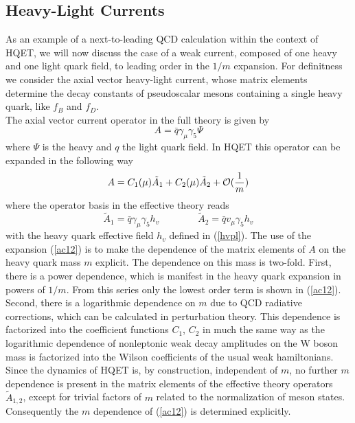 \subsection{Heavy-Light Currents}
\label{sec:HQET:Currents}
As an example of a next-to-leading QCD calculation within the context of
HQET, we will now discuss the case of a weak current, composed of one
heavy and one light quark field, to leading order in the $1/m$ expansion.
For definitness we consider the axial vector heavy-light current, whose
matrix elements determine the decay constants of pseudoscalar mesons
containing a single heavy quark, like $f_B$ and $f_D$.
\\
The axial vector current operator in the full theory is given by
\begin{equation}\label{aqq}
A=\bar q\gamma_\mu\gamma_5 \Psi
\end{equation}
where $\Psi$ is the heavy and $q$ the light quark field. In HQET this operator
can be expanded in the following way
\begin{equation}\label{ac12}
A=C_1(\mu)\tilde A_1+C_2(\mu)\tilde A_2+{\cal O}(\frac{1}{m})
\end{equation}
where the operator basis in the effective theory reads
\begin{equation}\label{at12}
\tilde A_1=\bar q\gamma_\mu\gamma_5 h_v \qquad\qquad
\tilde A_2=\bar q v_\mu\gamma_5 h_v
\end{equation}
with the heavy quark effective field $h_v$ defined in (\ref{hvpl}).
The use of the expansion (\ref{ac12}) is to make the dependence of the
matrix elements of $A$ on the heavy quark mass $m$ explicit. The dependence
on this mass is two-fold. First, there is a power dependence, which is 
manifest in the heavy quark expansion in powers of $1/m$. From this
series only the lowest order term is shown in (\ref{ac12}). Second, there is
a logarithmic dependence on $m$ due to QCD radiative corrections, which
can be calculated in perturbation theory. This dependence is factorized
into the coefficient functions $C_1$, $C_2$ in much the same way as the 
logarithmic dependence of nonleptonic weak decay amplitudes on the W boson 
mass is factorized into the Wilson coefficients of the usual weak
hamiltonians. Since the dynamics of HQET is, by construction, independent 
of $m$, no further $m$ dependence is present in the matrix
elements of the effective theory operators $\tilde A_{1,2}$, except for
trivial factors of $m$ related to the normalization of meson states.
Consequently the $m$ dependence of (\ref{ac12}) is determined explicitly. 

